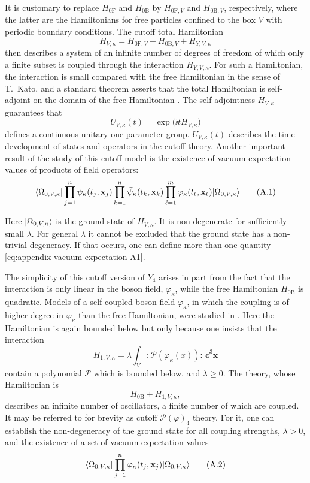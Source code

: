 It is customary to replace $H_{0\mathrm F}$ and $H_{0\mathrm B}$ by
$H_{0\mathrm F,V}$ and $H_{0\mathrm B,V}$, respectively, where the latter are
the Hamiltonians for free particles confined to the box $V$ with periodic
boundary conditions. The cutoff total Hamiltonian
\[
  H_{V,\kappa}=H_{0\mathrm F,V}+H_{0\mathrm B,V}+H_{Y;V,\kappa}
\]
then describes a system of an infinite number of degrees of freedom of which
only a finite subset is coupled through the interaction $H_{Y;V,\kappa}$. For
such a Hamiltonian, the interaction is small compared with the free
Hamiltonian in the sense of T.~Kato, and a standard theorem
asserts that the total Hamiltonian is self-adjoint on the domain of the free
Hamiltonian \cite{pct-app-10}. The self-adjointness $H_{V,\kappa}$ guarantees that
\[
  U_{V,\kappa}(t)=\exp\!\bigl(\ii tH_{V,\kappa}\bigr)
\]
defines a continuous unitary one-parameter group. $U_{V,\kappa}(t)$ describes
the time development of states and operators in the cutoff theory. Another
important result of the study of this cutoff model is the existence of vacuum
expectation values of products of field operators:
\begin{equation}
  \langle \Omega_{0,V,\kappa}\vert \displaystyle
      \prod_{j=1}^{n}\psi_\kappa(t_j,\mathbf{x}_j)
      \prod_{k=1}^{n}\bar\psi_\kappa(t_k,\mathbf{x}_k)
      \prod_{\ell=1}^{m}\varphi_\kappa(t_\ell,\mathbf{x}_\ell)\vert \Omega_{0,V,\kappa}\rangle
  \tag{A.1}\label{eq:appendix-vacuum-expectation-A1}
\end{equation}

Here $\lvert \Omega_{0,V,\kappa}\rangle$ is the ground state of $H_{V,\kappa}$. It is
non-degenerate for sufficiently small $\lambda$. For general $\lambda$ it
cannot be excluded that the ground state has a non-trivial degeneracy. If that
occurs, one can define more than one quantity \eqref{eq:appendix-vacuum-expectation-A1}.

The simplicity of this cutoff version of $Y_4$ arises in part from the fact
that the interaction is only linear in the boson field, $\varphi_\kappa$, while
the free Hamiltonian $H_{0\mathrm B}$ is quadratic. Models of a self-coupled
boson field $\varphi_\kappa$, in which the coupling is of higher degree in
$\varphi_\kappa$ than the free Hamiltonian, were studied in \cite{pct-app-11}. Here the
Hamiltonian is again bounded below but only because one insists that the
interaction
\[
  H_{1,V,\kappa}=\lambda\int_V :\mathcal{P}(\varphi_\kappa(x)):\,
    \dd^3\mathbf{x}
\]
contain a polynomial $\mathcal{P}$ which is bounded below, and $\lambda\geq0$.
The theory, whose Hamiltonian is
\[
  H_{0\mathrm B}+H_{1,V,\kappa},
\]
describes an infinite number of oscillators, a finite number of which are
coupled. It may be referred to for brevity as cutoff $\mathcal{P}(\varphi)_4$
theory. For it, one can establish the non-degeneracy of the ground state for
all coupling strengths, $\lambda>0$, and the existence of a set of vacuum
expectation values
\begin{equation}
  \langle \Omega_{0,V,\kappa}\vert \displaystyle\prod_{j=1}^{n}\varphi_\kappa(t_j,\mathbf{x}_j)\vert \Omega_{0,V,\kappa}\rangle
  \tag{A.2}\label{eq:appendix-vacuum-expectation-A2}
\end{equation}

